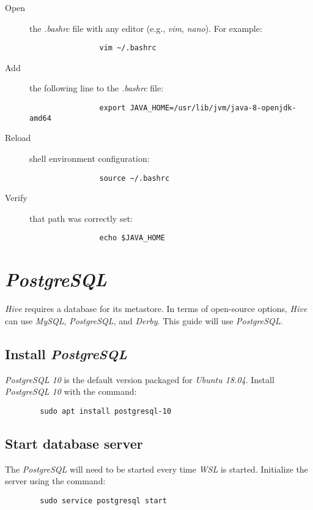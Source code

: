\documentclass{article}
\begin{document}
        \begin{description}

            \item[Open] the \emph{.bashrc} file with any editor (e.g., \emph{vim}, \emph{nano}).
            For example:
            \begin{verbatim}
                vim ~/.bashrc
            \end{verbatim}

            \item[Add] the following line to the \emph{.bashrc} file:
            \begin{verbatim}
                export JAVA_HOME=/usr/lib/jvm/java-8-openjdk-amd64                 
            \end{verbatim}
            
            \item[Reload] shell environment configuration:
            \begin{verbatim}
                source ~/.bashrc
            \end{verbatim}

            \item[Verify] that path was correctly set:
            \begin{verbatim}
                echo $JAVA_HOME
            \end{verbatim}
        \end{description}

\section{\emph{PostgreSQL}}
\emph{Hive} requires a database for its metastore. In terms of open-source options, \emph{Hive} can use
\emph{MySQL}, \emph{PostgreSQL}, and \emph{Derby}. This guide will use \emph{PostgreSQL}.

    \subsection{Install \emph{PostgreSQL}}
    \emph{PostgreSQL 10} is the default version packaged for \emph{Ubuntu 18.04}. Install
    \emph{PostgreSQL 10} with the command:
    \begin{verbatim}
        sudo apt install postgresql-10
    \end{verbatim}

    \subsection{Start database server}
    The \emph{PostgreSQL} will need to be started every time \emph{WSL} is started. Initialize the
    server using the command:
    \begin{verbatim}
        sudo service postgresql start
    \end{verbatim}
\end{document}
